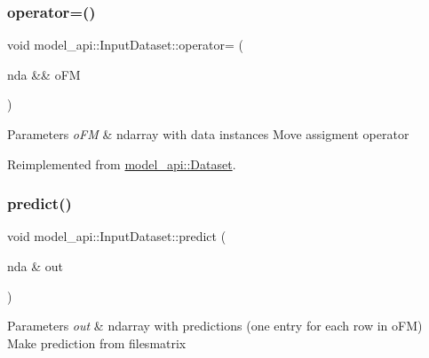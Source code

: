 \subsubsection{\texorpdfstring{operator=()}{operator=()}\hspace{0.1cm}{\footnotesize\ttfamily [2/2]}}
{\footnotesize\ttfamily void model\+\_\+api\+::\+Input\+Dataset\+::operator= (\begin{DoxyParamCaption}\item[{nda \&\&}]{o\+FM }\end{DoxyParamCaption})\hspace{0.3cm}{\ttfamily [virtual]}}


\begin{DoxyParams}{Parameters}
{\em o\+FM} & ndarray with data instances Move assigment operator \\
\hline
\end{DoxyParams}


Reimplemented from \hyperlink{classmodel__api_1_1Dataset_a48ed0afad3bae183a4615a4de9dba854}{model\+\_\+api\+::\+Dataset}.

\mbox{\label{classmodel__api_1_1InputDataset_af25824b44f866ff2b03e5d1036d7215a}} 
\subsubsection{\texorpdfstring{predict()}{predict()}}
{\footnotesize\ttfamily void model\+\_\+api\+::\+Input\+Dataset\+::predict (\begin{DoxyParamCaption}\item[{nda \&}]{out }\end{DoxyParamCaption})}


\begin{DoxyParams}{Parameters}
{\em out} & ndarray with predictions (one entry for each row in o\+FM) Make prediction from filesmatrix \\
\hline
\end{DoxyParams}
\mbox{\label{classmodel__api_1_1InputDataset_a71111535a17422db1f0fdbe2ac6ce1c8}} 
